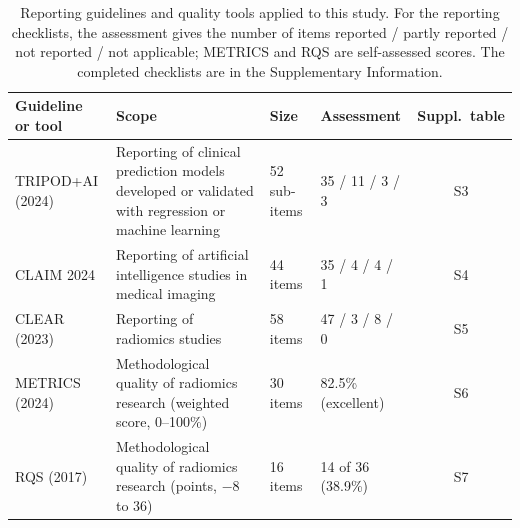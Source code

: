 \begin{table}[t]
\centering
\small
\caption{Reporting guidelines and quality tools applied to this study. For the reporting checklists, the assessment gives the number of items reported / partly reported / not reported / not applicable; METRICS and RQS are self-assessed scores. The completed checklists are in the Supplementary Information.}\label{tab:reporting}
\begin{tabularx}{\linewidth}{@{}l >{\raggedright\arraybackslash}X l l c@{}}
\toprule
Guideline or tool & Scope & Size & Assessment & Suppl.\ table \\
\midrule
TRIPOD+AI (2024) & Reporting of clinical prediction models developed or validated with regression or machine learning & 52 sub-items & 35 / 11 / 3 / 3 & S3 \\
CLAIM 2024 & Reporting of artificial intelligence studies in medical imaging & 44 items & 35 / 4 / 4 / 1 & S4 \\
CLEAR (2023) & Reporting of radiomics studies & 58 items & 47 / 3 / 8 / 0 & S5 \\
METRICS (2024) & Methodological quality of radiomics research (weighted score, 0--100\%) & 30 items & 82.5\% (excellent) & S6 \\
RQS (2017) & Methodological quality of radiomics research (points, $-$8 to 36) & 16 items & 14 of 36 (38.9\%) & S7 \\
\bottomrule
\end{tabularx}
\end{table}
